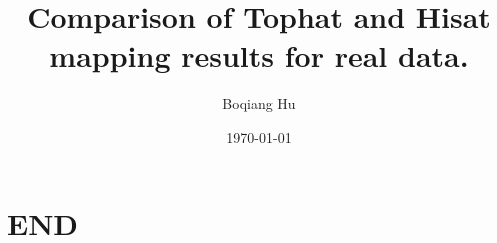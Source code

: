 \documentclass[hyperref={pdfpagelabels=false},compress]{beamer}
\begin{document}
    \title{Comparison of Tophat and Hisat mapping results for real data.}
    \author{Boqiang Hu}
    \date{\today}
    \begin{frame}
    	 \titlepage
    \end{frame}




\section{END}
\end{document}
